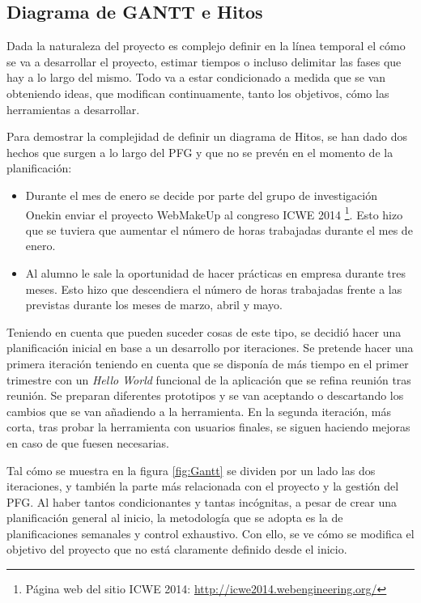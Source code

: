\subsection{Diagrama de GANTT e Hitos}
\label{sec:GANTTEHitos}

Dada la naturaleza del proyecto es complejo definir en la línea temporal el cómo se va a desarrollar el proyecto, estimar tiempos o incluso delimitar las fases que hay a lo largo del mismo. Todo va a estar condicionado a medida que se van obteniendo ideas, que modifican continuamente, tanto los objetivos, cómo las herramientas a desarrollar.

Para demostrar la complejidad de definir un diagrama de Hitos, se han dado dos hechos que surgen a lo largo del PFG y que no se prevén en el momento de la planificación:
\begin{itemize}
\item{Durante el mes de enero se decide por parte del grupo de investigación Onekin enviar el proyecto WebMakeUp al congreso ICWE 2014 \footnote{Página web del sitio ICWE 2014: \url{http://icwe2014.webengineering.org/}}. Esto hizo que se tuviera que aumentar el número de horas trabajadas durante el mes de enero.}
\item{Al alumno le sale la oportunidad de hacer prácticas en empresa durante tres meses. Esto hizo que descendiera el número de horas trabajadas frente a las previstas durante los meses de marzo, abril y mayo.}
\end{itemize}

Teniendo en cuenta que pueden suceder cosas de este tipo, se decidió hacer una planificación inicial en base a un desarrollo por iteraciones. Se pretende hacer una primera iteración teniendo en cuenta que se disponía de más tiempo en el primer trimestre con un \emph{Hello World} funcional de la aplicación que se refina reunión tras reunión. Se preparan diferentes prototipos y se van aceptando o descartando los cambios que se van añadiendo a la herramienta. En la segunda iteración, más corta, tras probar la herramienta con usuarios finales, se siguen haciendo mejoras en caso de que fuesen necesarias.

Tal cómo se muestra en la figura \ref{fig:Gantt} se dividen por un lado las dos iteraciones, y también la parte más relacionada con el proyecto y la gestión del PFG. Al haber tantos condicionantes y tantas incógnitas, a pesar de crear una planificación general al inicio, la metodología que se adopta es la de planificaciones semanales y control exhaustivo. Con ello, se ve cómo se modifica el objetivo del proyecto que no está claramente definido desde el inicio.

